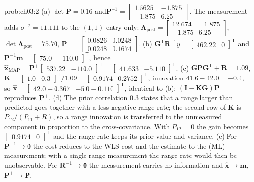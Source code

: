 \begin{sol}{prob:ch03:2}
(a) $\det\mathbf{P}=0.16$ and\allowbreak $\mathbf{P}^{-1}=\begin{bmatrix}1.5625&-1.875\\-1.875&6.25\end{bmatrix}$. The measurement adds $\sigma^{-2}=11.111$ to the $(1,1)$ entry only:
$\mathbf{\Lambda}_{\mathrm{post}}=\begin{bmatrix}12.674&-1.875\\-1.875&6.25\end{bmatrix}$, $\det\mathbf{\Lambda}_{\mathrm{post}}=75.70$,
$\mathbf{P}^{+}=\begin{bmatrix}0.0826&0.0248\\0.0248&0.1674\end{bmatrix}$.
(b) $\mathbf{G}^{\mathsf T}\mathbf{R}^{-1}y=\begin{bmatrix}462.22&0\end{bmatrix}^{\mathsf T}$ and\allowbreak $\mathbf{P}^{-1}\mathbf{m}=\begin{bmatrix}75.0&-110.0\end{bmatrix}^{\mathsf T}$, hence $\widehat{\mathbf{x}}_{\mathrm{MAP}}=\mathbf{P}^{+}\begin{bmatrix}537.22&-110.0\end{bmatrix}^{\mathsf T}=\begin{bmatrix}41.633&-5.110\end{bmatrix}^{\mathsf T}$.
(c) $\mathbf{G}\mathbf{P}\mathbf{G}^{\mathsf T}+\mathbf{R}=1.09$, $\mathbf{K}=\begin{bmatrix}1.0&0.3\end{bmatrix}^{\mathsf T}/1.09=\begin{bmatrix}0.9174&0.2752\end{bmatrix}^{\mathsf T}$, innovation $41.6-42.0=-0.4$, so $\widehat{\mathbf{x}}=\begin{bmatrix}42.0-0.367&-5.0-0.110\end{bmatrix}^{\mathsf T}$, identical to (b); $(\mathbf{I}-\mathbf{K}\mathbf{G})\mathbf{P}$ reproduces $\mathbf{P}^{+}$.
(d) The prior correlation $0.3$ states that a range larger than predicted goes together with a less negative range rate; the second row of $\mathbf{K}$ is $P_{12}/(P_{11}+R)$, so a range innovation is transferred to the unmeasured component in proportion to the cross-covariance. With $P_{12}=0$ the gain becomes $\begin{bmatrix}0.9174&0\end{bmatrix}^{\mathsf T}$ and the range rate keeps its prior value and variance.
(e) For $\mathbf{P}^{-1}\to\mathbf{0}$ the cost reduces to the WLS cost and the estimate to the (ML) measurement; with a single range measurement the range rate would then be unobservable. For $\mathbf{R}^{-1}\to\mathbf{0}$ the measurement carries no information and $\widehat{\mathbf{x}}\to\mathbf{m}$, $\mathbf{P}^{+}\to\mathbf{P}$.
\end{sol}

